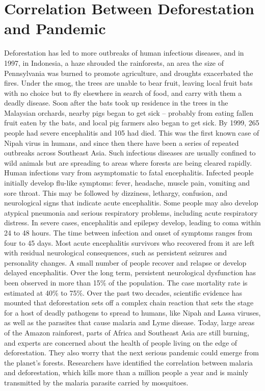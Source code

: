 \documentclass{book}\usepackage{knitr}
\begin{document}
\section{Correlation Between Deforestation and Pandemic}
Deforestation has led to more outbreaks of human infectious diseases, and in 1997, in Indonesia, a haze shrouded the rainforests, an area the size of Pennsylvania was burned to promote agriculture, and droughts exacerbated the fires. Under the smog, the trees are unable to bear fruit, leaving local fruit bats with no choice but to fly elsewhere in search of food, and carry with them a deadly disease. Soon after the bats took up residence in the trees in the Malaysian orchards, nearby pigs began to get sick -- probably from eating fallen fruit eaten by the bats, and local pig farmers also began to get sick. By 1999, 265 people had severe encephalitis and 105 had died. This was the first known case of Nipah virus in humans, and since then there have been a series of repeated outbreaks across Southeast Asia. Such infectious diseases are usually confined to wild animals but are spreading to areas where forests are being cleared rapidly. Human infections vary from asymptomatic to fatal encephalitis. Infected people initially develop flu-like symptoms: fever, headache, muscle pain, vomiting and sore throat. This may be followed by dizziness, lethargy, confusion, and neurological signs that indicate acute encephalitis. Some people may also develop atypical pneumonia and serious respiratory problems, including acute respiratory distress. In severe cases, encephalitis and epilepsy develop, leading to coma within 24 to 48 hours. The time between infection and onset of symptoms ranges from four to 45 days. Most acute encephalitis survivors who recovered from it are left with residual neurological consequences, such as persistent seizures and personality changes. A small number of people recover and relapse or develop delayed encephalitis. Over the long term, persistent neurological dysfunction has been observed in more than 15\% of the population. The case mortality rate is estimated at 40\% to 75\%. Over the past two decades, scientific evidence has mounted that deforestation sets off a complex chain reaction that sets the stage for a host of deadly pathogens to spread to humans, like Nipah and Lassa viruses, as well as the parasites that cause malaria and Lyme disease. Today, large areas of the Amazon rainforest, parts of Africa and Southeast Asia are still burning, and experts are concerned about the health of people living on the edge of deforestation. They also worry that the next serious pandemic could emerge from the planet's forests. Researchers have identified the correlation between malaria and deforestation, which kills more than a million people a year and is mainly transmitted by the malaria parasite carried by mosquitoes.
\end{document}
